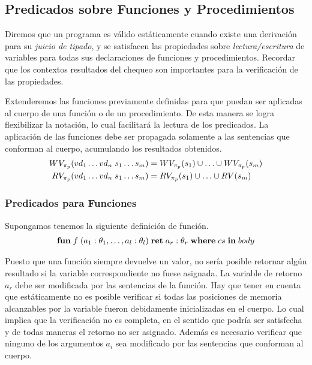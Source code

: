 \subsection{Predicados sobre Funciones y Procedimientos}

Diremos que un programa es válido estáticamente cuando existe una derivación para su \textit{juicio de tipado}, y se satisfacen las propiedades sobre \textit{lectura/escritura} de variables para todas sus declaraciones de funciones y procedimientos.
Recordar que los contextos resultados del chequeo son importantes para la verificación de las propiedades.

Extenderemos las funciones previamente definidas para que puedan ser aplicadas al cuerpo de una función o de un procedimiento.
De esta manera se logra flexibilizar la notación, lo cual facilitará la lectura de los predicados.
La aplicación de las funciones debe ser propagada solamente a las sentencias que conforman al cuerpo, acumulando los resultados obtenidos.
\begin{align*}
WV_{\pi_{p}}(vd_1 \ldots vd_n \; s_1 \ldots s_m) &= WV_{\pi_{p}}(s_1) \cup \ldots \cup WV_{\pi_{p}}(s_m)
\\
RV_{\pi_{p}}(vd_1 \ldots vd_n \; s_1 \ldots s_m) &= RV_{\pi_{p}}(s_1) \cup \ldots \cup RV(s_m)
\end{align*}

\subsubsection{Predicados para Funciones}

Supongamos tenemos la siguiente definición de función.
\begin{gather*}
\mathbf{fun} \; f \; (a_1: \theta_1, \ldots, a_l: \theta_l) \; \mathbf{ret} \; a_r: \theta_r \; \mathbf{where} \; cs \; \mathbf{in} \; body
\end{gather*}

Puesto que una función siempre devuelve un valor, no sería posible retornar algún resultado si la variable correspondiente no fuese asignada.
La variable de retorno $a_r$ debe ser modificada por las sentencias de la función.
Hay que tener en cuenta que estáticamente no es posible verificar si todas las posiciones de memoria alcanzables por la variable fueron debidamente inicializadas en el cuerpo.
Lo cual implica que la verificación no es completa, en el sentido que podría ser satisfecha y de todas maneras el retorno no ser asignado.
Además es necesario verificar que ninguno de los argumentos $a_i$ sea modificado por las sentencias que conforman al cuerpo.

